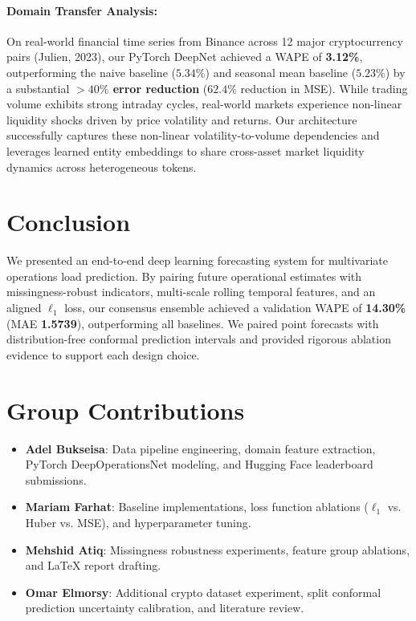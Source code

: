 \documentclass[11pt,a4paper]{article}
\begin{document}
\paragraph{Domain Transfer Analysis:} On real-world financial time series from Binance across 12 major cryptocurrency pairs (Julien, 2023), our PyTorch DeepNet achieved a WAPE of \textbf{3.12\%}, outperforming the naive baseline ($5.34\%$) and seasonal mean baseline ($5.23\%$) by a substantial \textbf{$>40\%$ error reduction} ($62.4\%$ reduction in MSE). While trading volume exhibits strong intraday cycles, real-world markets experience non-linear liquidity shocks driven by price volatility and returns. Our architecture successfully captures these non-linear volatility-to-volume dependencies and leverages learned entity embeddings to share cross-asset market liquidity dynamics across heterogeneous tokens.

\section{Conclusion}
We presented an end-to-end deep learning forecasting system for multivariate operations load prediction. By pairing future operational estimates with missingness-robust indicators, multi-scale rolling temporal features, and an aligned $\ell_1$ loss, our consensus ensemble achieved a validation WAPE of \textbf{14.30\%} (MAE \textbf{1.5739}), outperforming all baselines. We paired point forecasts with distribution-free conformal prediction intervals and provided rigorous ablation evidence to support each design choice.

\section*{Group Contributions}
\begin{itemize}
    \item \textbf{Adel Bukseisa}: Data pipeline engineering, domain feature extraction, PyTorch DeepOperationsNet modeling, and Hugging Face leaderboard submissions.
    \item \textbf{Mariam Farhat}: Baseline implementations, loss function ablations ($\ell_1$ vs. Huber vs. MSE), and hyperparameter tuning.
    \item \textbf{Mehshid Atiq}: Missingness robustness experiments, feature group ablations, and LaTeX report drafting.
    \item \textbf{Omar Elmorsy}: Additional crypto dataset experiment, split conformal prediction uncertainty calibration, and literature review.
\end{itemize}



\end{document}
